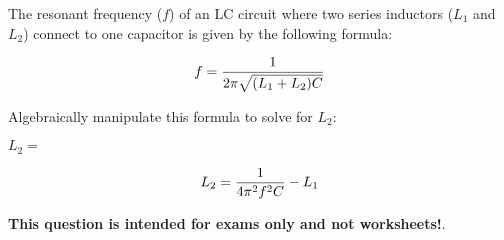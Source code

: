 

The resonant frequency ($f$) of an LC circuit where two series inductors ($L_1$ and $L_2$) connect to one capacitor is given by the following formula:

$$f = {1 \over {2 \pi \sqrt{(L_1 + L_2) C}}}$$

Algebraically manipulate this formula to solve for $L_2$:

\vskip 20pt

$L_2 = $







$$L_2 = {1 \over {4 \pi^2 f^2 C}} - L_1$$







{\bf This question is intended for exams only and not worksheets!}.



